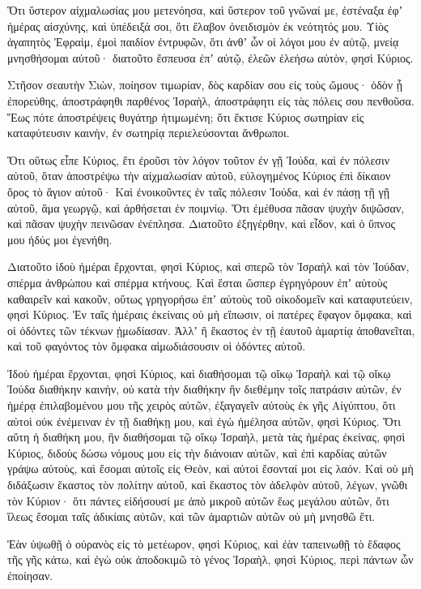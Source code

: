 {Ὅτι ὕστερον αἰχμαλωσίας μου μετενόησα, καὶ ὕστερον τοῦ γνῶναί με, ἐστέναξα ἐφʼ ἡμέρας αἰσχύνης, καὶ ὑπέδειξά σοι, ὅτι ἔλαβον ὀνειδισμὸν ἐκ νεότητός μου.
Υἱὸς ἀγαπητὸς Ἐφραὶμ, ἐμοὶ παιδίον ἐντρυφῶν, ὅτι ἀνθʼ ὧν οἱ λόγοι μου ἐν αὐτῷ, μνείᾳ μνησθήσομαι αὐτοῦ· διατοῦτο ἔσπευσα ἐπʼ αὐτῷ, ἐλεῶν ἐλεήσω αὐτὸν, φησὶ Κύριος.
\par }{\PP {}Στῆσον σεαυτὴν Σιὼν, ποίησον τιμωρίαν, δὸς καρδίαν σου εἰς τοὺς ὤμους· ὁδὸν ᾗ ἐπορεύθης, ἀποστράφηθι παρθένος Ἰσραὴλ, ἀποστράφητι εἰς τὰς πόλεις σου πενθοῦσα.
Ἕως πότε ἀποστρέψεις θυγάτηρ ἠτιμωμένη; ὅτι ἔκτισε Κύριος σωτηρίαν εἰς καταφύτευσιν καινὴν, ἐν σωτηρίᾳ περιελεύσονται ἄνθρωποι.
\par }{\PP {}Ὅτι οὕτως εἶπε Κύριος, ἔτι ἐροῦσι τὸν λόγον τοῦτον ἐν γῇ Ἰούδα, καὶ ἐν πόλεσιν αὐτοῦ, ὅταν ἀποστρέψω τὴν αἰχμαλωσίαν αὐτοῦ, εὐλογημένος Κύριος ἐπὶ δίκαιον ὄρος τὸ ἅγιον αὐτοῦ·
Καὶ ἐνοικοῦντες ἐν ταῖς πόλεσιν Ἰούδα, καὶ ἐν πάσῃ τῇ γῇ αὐτοῦ, ἅμα γεωργῷ, καὶ ἀρθήσεται ἐν ποιμνίῳ.
Ὅτι ἐμέθυσα πᾶσαν ψυχὴν διψῶσαν, καὶ πᾶσαν ψυχὴν πεινῶσαν ἐνέπλησα.
Διατοῦτο ἐξηγέρθην, καὶ εἶδον, καὶ ὁ ὕπνος μου ἡδύς μοι ἐγενήθη.
\par }{\PP {}Διατοῦτο ἰδοὺ ἡμέραι ἔρχονται, φησὶ Κύριος, καὶ σπερῶ τὸν Ἰσραὴλ καὶ τὸν Ἰούδαν, σπέρμα ἀνθρώπου καὶ σπέρμα κτήνους.
Καὶ ἔσται ὥσπερ ἐγρηγόρουν ἐπʼ αὐτοὺς καθαιρεῖν καὶ κακοῦν, οὕτως γρηγορήσω ἐπʼ αὐτοὺς τοῦ οἰκοδομεῖν καὶ καταφυτεύειν, φησὶ Κύριος.
Ἐν ταῖς ἡμέραις ἐκείναις οὐ μὴ εἴπωσιν, οἱ πατέρες ἔφαγον ὄμφακα, καὶ οἱ ὀδόντες τῶν τέκνων ᾑμωδίασαν.
Ἀλλʼ ἢ ἕκαστος ἐν τῇ ἑαυτοῦ ἁμαρτίᾳ ἀποθανεῖται, καὶ τοῦ φαγόντος τὸν ὄμφακα αἱμωδιάσουσιν οἱ ὀδόντες αὐτοῦ.
\par }{\PP {}Ἰδοὺ ἡμέραι ἔρχονται, φησὶ Κύριος, καὶ διαθήσομαι τῷ οἴκῳ Ἰσραὴλ καὶ τῷ οἴκῳ Ἰούδα διαθήκην καινὴν,
οὐ κατὰ τὴν διαθήκην ἣν διεθέμην τοῖς πατράσιν αὐτῶν, ἐν ἡμέρᾳ ἐπιλαβομένου μου τῆς χειρὸς αὐτῶν, ἐξαγαγεῖν αὐτοὺς ἐκ γῆς Αἰγύπτου, ὅτι αὐτοὶ οὐκ ἐνέμειναν ἐν τῇ διαθήκῃ μου, καὶ ἐγὼ ἠμέλησα αὐτῶν, φησὶ Κύριος.
Ὅτι αὕτη ἡ διαθήκη μου, ἣν διαθήσομαι τῷ οἴκῳ Ἰσραὴλ, μετὰ τὰς ἡμέρας ἐκείνας, φησὶ Κύριος, διδοὺς δώσω νόμους μου εἰς τὴν διάνοιαν αὐτῶν, καὶ ἐπὶ καρδίας αὐτῶν γράψω αὐτοὺς, καὶ ἔσομαι αὐτοῖς εἰς Θεὸν, καὶ αὐτοὶ ἔσονταί μοι εἰς λαόν.
Καὶ οὐ μὴ διδάξωσιν ἕκαστος τὸν πολίτην αὐτοῦ, καὶ ἕκαστος τὸν ἀδελφὸν αὐτοῦ, λέγων, γνῶθι τὸν Κύριον· ὅτι πάντες εἰδήσουσί με ἀπὸ μικροῦ αὐτῶν ἕως μεγάλου αὐτῶν, ὅτι ἵλεως ἔσομαι ταῖς ἀδικίαις αὐτῶν, καὶ τῶν ἁμαρτιῶν αὐτῶν οὐ μὴ μνησθῶ ἔτι.
\par }{\PP {}Ἐὰν ὑψωθῇ ὁ οὐρανὸς εἰς τὸ μετέωρον, φησὶ Κύριος, καὶ ἐὰν ταπεινωθῇ τὸ ἔδαφος τῆς γῆς κάτω, καὶ ἐγὼ οὐκ ἀποδοκιμῶ τὸ γένος Ἰσραὴλ, φησὶ Κύριος, περὶ πάντων ὧν ἐποίησαν.
}
